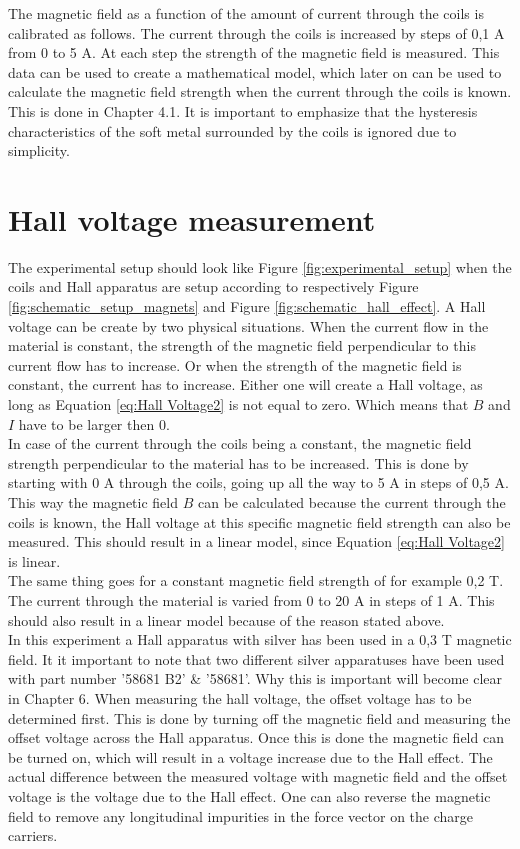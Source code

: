 The magnetic field as a function of the amount of current through the coils is calibrated as follows. The current through the coils is increased by steps of 0,1 A from 0 to 5 A. At each step the strength of the magnetic field is measured. This data can be used to create a mathematical model, which later on can be used to calculate the magnetic field strength when the current through the coils is known. This is done in Chapter 4.1. It is important to emphasize that the hysteresis characteristics of the soft metal surrounded by the coils is ignored due to simplicity.

\section{Hall voltage measurement}
The experimental setup should look like Figure \ref{fig:experimental_setup} when the coils and Hall apparatus are setup according to respectively Figure \ref{fig:schematic_setup_magnets} and Figure \ref{fig:schematic_hall_effect}. A Hall voltage can be create by two physical situations. When the current flow in the material is constant, the strength of the magnetic field perpendicular to this current flow has to increase. Or when the strength of the magnetic field is constant, the current has to increase. Either one will create a Hall voltage, as long as Equation \ref{eq:Hall Voltage2} is not equal to zero. Which means that $B$ and $I$ have to be larger then 0. \\
In case of the current through the coils being a constant, the magnetic field strength perpendicular to the material has to be increased. This is done by starting with 0 A through the coils, going up all the way to 5 A in steps of 0,5 A. This way the magnetic field $B$ can be calculated because the current through the coils is known, the Hall voltage at this specific magnetic field strength can also be measured. This should result in a linear model, since Equation \ref{eq:Hall Voltage2} is linear. \\
The same thing goes for a constant magnetic field strength of for example 0,2 T. The current through the material is varied from 0 to 20 A in steps of 1 A. This should also result in a linear model because of the reason stated above. \\
In this experiment a Hall apparatus with silver has been used in a 0,3 T magnetic field. It it important to note that two different silver apparatuses have been used with part number '58681 B2' \& '58681'. Why this is important will become clear in Chapter 6. When measuring the hall voltage, the offset voltage has to be determined first. This is done by turning off the magnetic field and measuring the offset voltage across the Hall apparatus. Once this is done the magnetic field can be turned on, which will result in a voltage increase due to the Hall effect. The actual difference between the measured voltage with magnetic field and the offset voltage is the voltage due to the Hall effect. One can also reverse the magnetic field to remove any longitudinal impurities in the force vector on the charge carriers.

